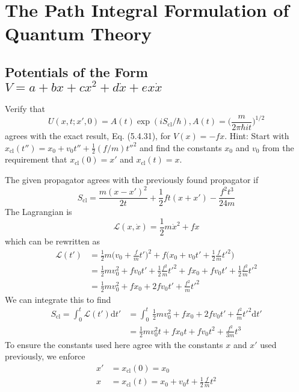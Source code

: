 \documentclass[../principles-of-quantum-mechanics.tex]{subfiles}
\begin{document}
	\printanswers
	
	\setcounter{section}{7}
	\section{The Path Integral Formulation of Quantum Theory}
	
	\setcounter{subsection}{5}
	\subsection{Potentials of the Form $V = a + bx + cx^2 + d\dot{x} + ex\dot{x}$}
	
	\begin{questions}
		\question Verify that
		$$U(x, t; x', 0) = A(t)\exp(i S_{\text{cl}}/\hbar), A(t)=\Big(\frac{m}{2\pi\hbar it}\Big)^{1/2}$$
		agrees with the exact result, Eq. (5.4.31), for $V(x) = -fx$. Hint: Start with $x_{\text{cl}}(t'') = x_0 + v_0t'' + \tfrac{1}{2}(f/m)t''^2$ and find the constants $x_0$ and $v_0$ from the requirement that $x_{\text{cl}}(0) = x'$ and $x_{\text{cl}}(t) = x$.
		\begin{solution}
			The given propagator agrees with the previously found propagator if
			$$S_{\text{cl}} = \frac{m(x - x')^2}{2t} + \frac{1}{2}ft(x + x') - \frac{f^2t^3}{24m}$$
			The Lagrangian is
			$$\mathcal{L}(x, \dot{x}) = \frac{1}{2}m\dot{x}^2 + fx$$
			which can be rewritten as
			\begin{align*}
				\mathcal{L}(t') &= \frac{1}{2}m\Big(v_0 + \frac{f}{m}t'\Big)^2 + f\Big(x_0 + v_0t' + \frac{1}{2}\frac{f}{m}t'^2\Big) \\
				&= \frac{1}{2}mv_0^2 + fv_0t' + \frac{1}{2}\frac{f^2}{m}t'^2 + fx_0 + fv_0t' + \frac{1}{2}\frac{f^2}{m}t'^2 \\
				&= \frac{1}{2}mv_0^2 + fx_0 + 2fv_0t' + \frac{f^2}{m}t'^2
			\end{align*}
			We can integrate this to find
			\begin{align*}
				S_\text{cl} = \int_0^t\mathcal{L}(t')\mathrm{d}t' &= \int_0^t\,\frac{1}{2}mv_0^2 + fx_0 + 2fv_0t' + \frac{f^2}{m}t'^2\mathrm{d}t' \\
				&= \frac{1}{2}mv_0^2t + fx_0t + fv_0t^2 + \frac{f^2}{3m}t^3
			\end{align*}
			To ensure the constants used here agree with the constants $x$ and $x'$ used previously, we enforce
			\begin{align*}
				x' &= x_{\text{cl}}(0) = x_0 \\
				x &= x_{\text{cl}}(t) = x_0 + v_0t + \frac{1}{2}\frac{f}{m}t^2

\end{align*}
\end{solution}
\end{questions}
\end{document}
